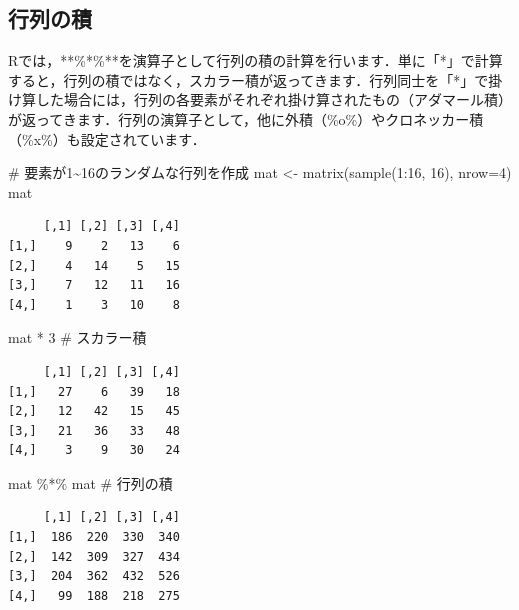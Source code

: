 \documentclass[
  letterpaper,
  DIV=11,
  numbers=noendperiod]{scrreprt}
\newenvironment{Shaded}{\begin{snugshade}}{\end{snugshade}}
\newcommand{\AttributeTok}[1]{\textcolor[rgb]{0.40,0.45,0.13}{#1}}
\newcommand{\CommentTok}[1]{\textcolor[rgb]{0.37,0.37,0.37}{#1}}
\newcommand{\DecValTok}[1]{\textcolor[rgb]{0.68,0.00,0.00}{#1}}
\newcommand{\FunctionTok}[1]{\textcolor[rgb]{0.28,0.35,0.67}{#1}}
\newcommand{\NormalTok}[1]{\textcolor[rgb]{0.00,0.23,0.31}{#1}}
\newcommand{\OtherTok}[1]{\textcolor[rgb]{0.00,0.23,0.31}{#1}}
\newcommand{\SpecialCharTok}[1]{\textcolor[rgb]{0.37,0.37,0.37}{#1}}
\begin{document}
\hypertarget{ux884cux5217ux306eux7a4d}{%
\subsection{行列の積}\label{ux884cux5217ux306eux7a4d}}

Rでは，**\%*\%**を演算子として行列の積の計算を行います．単に「*」で計算すると，行列の積ではなく，スカラー積が返ってきます．行列同士を「*」で掛け算した場合には，行列の各要素がそれぞれ掛け算されたもの（アダマール積）が返ってきます．行列の演算子として，他に外積（\%o\%）やクロネッカー積（\%x\%）も設定されています．

\begin{Shaded}
\begin{Highlighting}[]
\CommentTok{\# 要素が1\textasciitilde{}16のランダムな行列を作成}
\NormalTok{mat }\OtherTok{\textless{}{-}} \FunctionTok{matrix}\NormalTok{(}\FunctionTok{sample}\NormalTok{(}\DecValTok{1}\SpecialCharTok{:}\DecValTok{16}\NormalTok{, }\DecValTok{16}\NormalTok{), }\AttributeTok{nrow=}\DecValTok{4}\NormalTok{) }
\NormalTok{mat}
\end{Highlighting}
\end{Shaded}

\begin{verbatim}
     [,1] [,2] [,3] [,4]
[1,]    9    2   13    6
[2,]    4   14    5   15
[3,]    7   12   11   16
[4,]    1    3   10    8
\end{verbatim}

\begin{Shaded}
\begin{Highlighting}[]
\NormalTok{mat }\SpecialCharTok{*} \DecValTok{3} \CommentTok{\# スカラー積}
\end{Highlighting}
\end{Shaded}

\begin{verbatim}
     [,1] [,2] [,3] [,4]
[1,]   27    6   39   18
[2,]   12   42   15   45
[3,]   21   36   33   48
[4,]    3    9   30   24
\end{verbatim}

\begin{Shaded}
\begin{Highlighting}[]
\NormalTok{mat }\SpecialCharTok{\%*\%}\NormalTok{ mat }\CommentTok{\# 行列の積}
\end{Highlighting}
\end{Shaded}

\begin{verbatim}
     [,1] [,2] [,3] [,4]
[1,]  186  220  330  340
[2,]  142  309  327  434
[3,]  204  362  432  526
[4,]   99  188  218  275
\end{verbatim}
\end{document}
